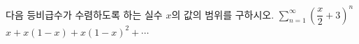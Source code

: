 다음 등비급수가 수렴하도록 하는 실수 $x$의 값의 범위를 구하시오.
 $\displaystyle\sum_{n=1}^{\infty}\left(\dfrac{x}{2}+3\right)^{n}$
 $x+x(1-x)+x(1-x)^{2}+\cdots$
